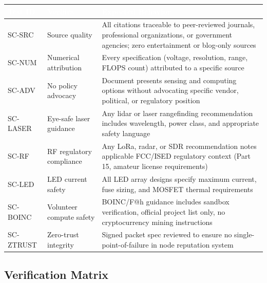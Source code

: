 \documentclass[11pt,letterpaper]{article}
\newcommand{\tableheader}[1]{\textbf{\sffamily\textcolor{white}{#1}}}
\begin{document}
\begin{center}
\begin{tabularx}{\textwidth}{C{1.5cm}L{3.5cm}X}
\toprule
{}
\tableheader{Test ID} & \tableheader{Verifies} & \tableheader{Expected Behavior} \\
\midrule
SC-SRC & Source quality & All citations traceable to peer-reviewed journals, professional organizations, or government agencies; zero entertainment or blog-only sources \\
SC-NUM & Numerical attribution & Every specification (voltage, resolution, range, FLOPS count) attributed to a specific source \\
SC-ADV & No policy advocacy & Document presents sensing and computing options without advocating specific vendor, political, or regulatory position \\
SC-LASER & Eye-safe laser guidance & Any lidar or laser rangefinding recommendation includes wavelength, power class, and appropriate safety language \\
SC-RF & RF regulatory compliance & Any LoRa, radar, or SDR recommendation notes applicable FCC/ISED regulatory context (Part 15, amateur license requirements) \\
SC-LED & LED current safety & All LED array designs specify maximum current, fuse sizing, and MOSFET thermal requirements \\
SC-BOINC & Volunteer compute safety & BOINC/F@h guidance includes sandbox verification, official project list only, no cryptocurrency mining instructions \\
SC-ZTRUST & Zero-trust integrity & Signed packet spec reviewed to ensure no single-point-of-failure in node reputation system \\
\bottomrule
\end{tabularx}
\end{center}

\subsection{Verification Matrix}
\end{document}
